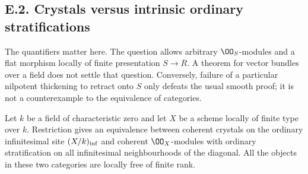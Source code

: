 \subsection{E.2. Crystals versus intrinsic ordinary stratifications}

The quantifiers matter here.  The question allows arbitrary $\OO_S$-modules and a flat morphism locally of finite presentation $S\to R$.  A theorem for vector bundles over a field does not settle that question.  Conversely, failure of a particular nilpotent thickening to retract onto $S$ only defeats the usual smooth proof; it is not a counterexample to the equivalence of categories.

\begin{proposition}\label{prop:DE-E2-coherent}
Let $k$ be a field of characteristic zero and let $X$ be a scheme locally of finite type over $k$.  Restriction gives an equivalence between coherent crystals on the ordinary infinitesimal site $(X/k)_{\rm inf}$ and coherent $\OO_X$-modules with ordinary stratification on all infinitesimal neighbourhoods of the diagonal.  All the objects in these two categories are locally free of finite rank.
\end{proposition}
